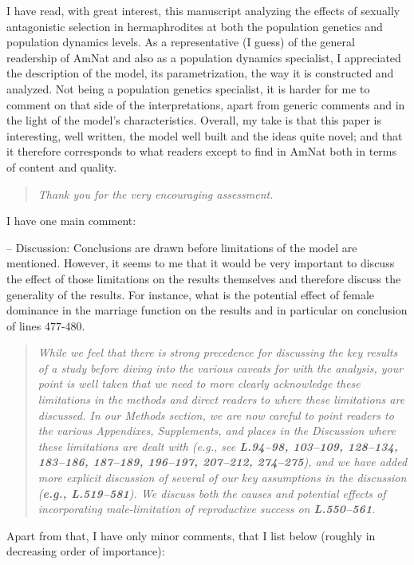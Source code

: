 \documentclass[11pt]{article}
\begin{document}
I have read, with great interest, this manuscript analyzing the effects of sexually antagonistic selection in hermaphrodites at both the population genetics and population dynamics levels. As a representative (I guess) of the general readership of AmNat and also as a population dynamics specialist, I appreciated the description of the model, its parametrization, the way it is constructed and analyzed. Not being a population genetics specialist, it is harder for me to comment on that side of the interpretations, apart from generic comments and in the light of the model’s characteristics. Overall, my take is that this paper is interesting, well written, the model well built and the ideas quite novel; and that it therefore corresponds to what readers except to find in AmNat both in terms of content and quality.

\begin{quote}
	{\itshape Thank you for the very encouraging assessment.}
\end{quote}

\noindent I have one main comment:

\noindent-- Discussion: Conclusions are drawn before limitations of the model are mentioned. However, it seems to me that it would be very important to discuss the effect of those limitations on the results themselves and therefore discuss the generality of the results. For instance, what is the potential effect of female dominance in the marriage function on the results and in particular on conclusion of lines 477-480.

\begin{quote}
	{\itshape While we feel that there is strong precedence for discussing the key results of a study before diving into the various caveats for with the analysis, your point is well taken that we need to more clearly acknowledge these limitations in the methods and direct readers to where these limitations are discussed. In our Methods section, we are now careful to point readers to the various Appendixes, Supplements, and places in the Discussion where these limitations are dealt with (e.g., see {\bf L.94--98, 103--109, 128--134, 183--186, 187--189, 196--197, 207--212, 274--275}), and we have added more explicit discussion of several of our key assumptions in the discussion ({\bf e.g., L.519--581}). We discuss both the causes and potential effects of incorporating male-limitation of reproductive success on {\bf L.550--561}}.
\end{quote}

\noindent Apart from that, I have only minor comments, that I list below (roughly in decreasing order of importance):
\bigskip 
\end{document}
